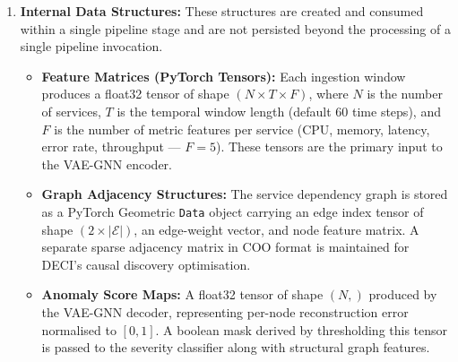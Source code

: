\begin{enumerate}[label=\Alph*.]

    \item \textbf{Internal Data Structures:}
    These structures are created and consumed within a single pipeline stage and are not persisted beyond the processing of a single pipeline invocation.
    \begin{itemize}
        \item \textbf{Feature Matrices (PyTorch Tensors):} Each ingestion window produces a float32 tensor of shape $(N \times T \times F)$, where $N$ is the number of services, $T$ is the temporal window length (default 60 time steps), and $F$ is the number of metric features per service (CPU, memory, latency, error rate, throughput — $F = 5$). These tensors are the primary input to the VAE-GNN encoder.
        \item \textbf{Graph Adjacency Structures:} The service dependency graph is stored as a PyTorch Geometric \texttt{Data} object carrying an edge index tensor of shape $(2 \times |\mathcal{E}|)$, an edge-weight vector, and node feature matrix. A separate sparse adjacency matrix in COO format is maintained for DECI's causal discovery optimisation.
        \item \textbf{Anomaly Score Maps:} A float32 tensor of shape $(N,)$ produced by the VAE-GNN decoder, representing per-node reconstruction error normalised to $[0, 1]$. A boolean mask derived by thresholding this tensor is passed to the severity classifier along with structural graph features.
    \end{itemize}


\end{enumerate}
